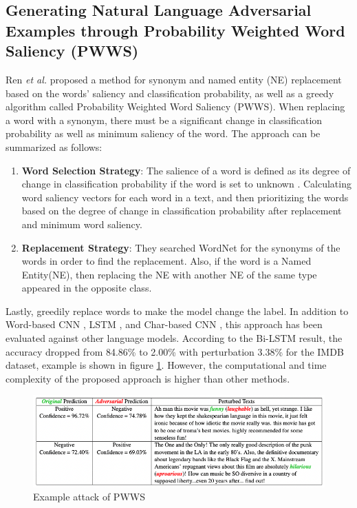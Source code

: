 \documentclass[%
	BCOR=8mm, %
	DIV=12,
	toc=bibliography, %
	toc=listof, %
	oneside, %
	egregdoesnotlikesansseriftitles, %
	]{scrbook}
\begin{document}
\subsection{Generating Natural Language Adversarial Examples through Probability Weighted Word Saliency (PWWS)}
\label{subsection:generatingadversarialexample}
Ren \textit{et al.} \cite{ren_generating_2019} proposed a method for synonym and named entity (NE) replacement based on the words' saliency and classification probability, as well as a greedy algorithm called Probability Weighted Word Saliency (PWWS). When replacing a word with a synonym, there must be a significant change in classification probability as well as minimum saliency of the word. The approach can be summarized as follows:

\begin{enumerate}
    \item \textbf{Word Selection Strategy}:  
   The salience of a word is defined as its degree of change in classification probability if the word is set to unknown \cite{li_understanding_2017}. Calculating word saliency vectors for each word in a text, and then prioritizing the words based on the degree of change in classification probability after replacement and minimum word saliency.
    \item \textbf{Replacement Strategy}: They searched WordNet for the synonyms of the words in order to find the replacement. Also, if the word is a Named Entity(NE), then replacing the NE with another NE of the same type appeared in the opposite class.
\end{enumerate}
Lastly, greedily replace words to make the model change the label. In addition to Word-based CNN \cite{kim_convolutional_2014},  LSTM \cite{hochreiter_long_1997},  and Char-based CNN \cite{zhang_character-level_2016}, this approach has been evaluated against other language models. According to the Bi-LSTM result, the accuracy dropped from 84.86\% to 2.00\% with perturbation 3.38\% for the IMDB dataset, example is shown in figure \ref{diag:pwwsexp}. However, the computational and time complexity of the proposed approach is higher than other methods.

\begin{figure}[h!]
    \centering
    \includegraphics[width=.8\textwidth]{img/PWWSexample.png}
    \caption[Example of PWWS attack recipe]{Example attack of PWWS\cite{ren_generating_2019} }
    \label{diag:pwwsexp}
\end{figure}
\end{document}
